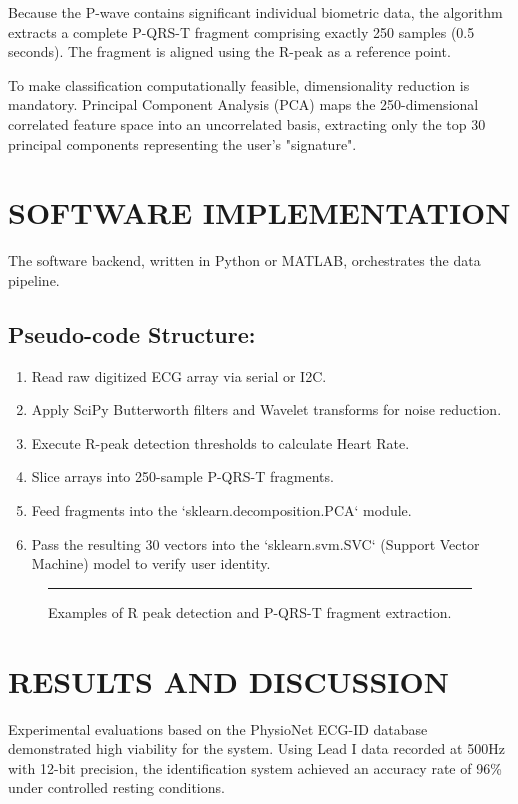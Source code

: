 \documentclass[12pt,a4paper]{report}
\begin{document}
Because the P-wave contains significant individual biometric data, the algorithm extracts a complete P-QRS-T fragment comprising exactly 250 samples (0.5 seconds). The fragment is aligned using the R-peak as a reference point.

To make classification computationally feasible, dimensionality reduction is mandatory. Principal Component Analysis (PCA) maps the 250-dimensional correlated feature space into an uncorrelated basis, extracting only the top 30 principal components representing the user's "signature".

\chapter{SOFTWARE IMPLEMENTATION}
The software backend, written in Python or MATLAB, orchestrates the data pipeline. 

\section{Pseudo-code Structure:}
\begin{enumerate}
    \item Read raw digitized ECG array via serial or I2C.
    \item Apply SciPy Butterworth filters and Wavelet transforms for noise reduction.
    \item Execute R-peak detection thresholds to calculate Heart Rate.
    \item Slice arrays into 250-sample P-QRS-T fragments.
    \item Feed fragments into the `sklearn.decomposition.PCA` module.
    \item Pass the resulting 30 vectors into the `sklearn.svm.SVC` (Support Vector Machine) model to verify user identity.
\end{enumerate}

\begin{figure}[htbp]
    \centering
    \rule{10cm}{6cm} %
    \caption{Examples of R peak detection and P-QRS-T fragment extraction.}
\end{figure}

\chapter{RESULTS AND DISCUSSION}
Experimental evaluations based on the PhysioNet ECG-ID database demonstrated high viability for the system. Using Lead I data recorded at 500Hz with 12-bit precision, the identification system achieved an accuracy rate of 96\% under controlled resting conditions. 
\end{document}
